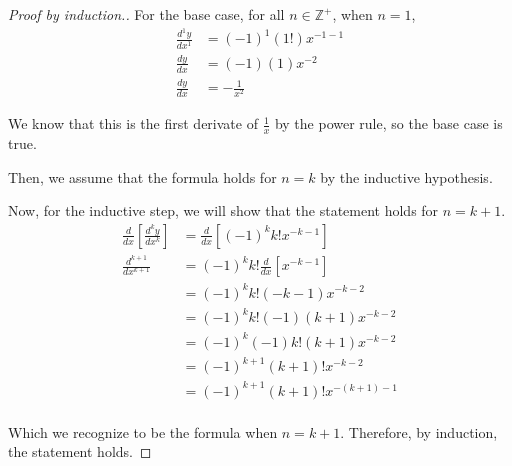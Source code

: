 \documentclass[../hw3.tex]{subfiles}
\begin{document}
\begin{proof}[Proof by induction.]

    For the base case, for all $n \in \mathbb{Z}^+$, when $n = 1$,
    \begin{align*}
        \frac{d^1y}{dx^1} &= {(-1)}^1 (1!) x^{-1-1} \\
        \frac{dy}{dx} &= (-1) (1) x^{-2} \\
        \frac{dy}{dx} &= -\frac{1}{x^2}
    \end{align*}

    We know that this is the first derivate of $\frac{1}{x}$ by the power rule, so the base case is true.

    Then, we assume that the formula holds for $n = k$ by the inductive hypothesis.

    Now, for the inductive step, we will show that the statement holds for $n = k+1$.
    \begin{align*}
        \frac{d}{dx} \left[ \frac{d^{k}y}{dx^k} \right] &= \frac{d}{dx} \left[ {(-1)}^{k}k!x^{-k-1} \right] \\
        \frac{d^{k+1}}{dx^{k+1}} &= {(-1)}^{k}k! \frac{d}{dx}\left[ x^{-k-1} \right] \\
        &= {(-1)}^{k}k! (-k-1) x^{-k-2} \\
        &= {(-1)}^{k}k! (-1)(k+1) x^{-k-2} \\
        &= {(-1)}^{k}(-1) k!(k+1) x^{-k-2} \\
        &= {(-1)}^{k+1} (k+1)! x^{-k-2} \\
        &= {(-1)}^{k+1} (k+1)! x^{-(k+1)-1} \\
    \end{align*}

    Which we recognize to be the formula when $n = k+1$. Therefore, by induction, the statement holds.
\end{proof}
\end{document}
